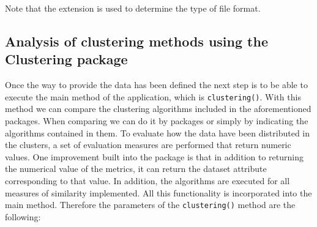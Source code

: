 \documentclass[
]{article}
\begin{document}
Note that the extension is used to determine the type of file format.

\hypertarget{analysis-of-clustering-methods-using-the-clustering-package}{%
\subsection{\texorpdfstring{Analysis of clustering methods using the
\textbf{Clustering}
package}{Analysis of clustering methods using the Clustering package}}\label{analysis-of-clustering-methods-using-the-clustering-package}}

Once the way to provide the data has been defined the next step is to be
able to execute the main method of the application, which is
\texttt{clustering()}. With this method we can compare the clustering
algorithms included in the aforementioned packages. When comparing we
can do it by packages or simply by indicating the algorithms contained
in them. To evaluate how the data have been distributed in the clusters,
a set of evaluation measures are performed that return numeric values.
One improvement built into the package is that in addition to returning
the numerical value of the metrics, it can return the dataset attribute
corresponding to that value. In addition, the algorithms are executed
for all measures of similarity implemented. All this functionality is
incorporated into the main method. Therefore the parameters of the
\texttt{clustering()} method are the following:
\end{document}
